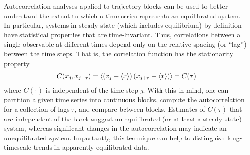 Autocorrelation analyses applied to trajectory blocks can be used to better understand the extent to which a time series represents an equilibrated system.  In particular, systems in steady-state (which includes equilibrium) by definition have statistical properties that are time-invariant.  Thus, correlations between a single observable at different times depend only on the relative spacing (or ``lag'') between the time steps.  That is, the correlation function has the stationarity property
%
\begin{equation}
 C(x_j,x_{j+\tau}) = \left< \left(x_j - \langle x \rangle \right) \left(x_{j+\tau} - \langle x \rangle \right) \right> = C(\tau)
\end{equation}
%
where $C(\tau)$ is independent of the time step $j$.  With this in mind, one can partition a given time series into continuous blocks, compute the autocorrelation for a collection of lags $\tau$, and compare between blocks.  Estimates of $C(\tau)$ that are independent of the block suggest an equilibrated (or at least a steady-state) system, whereas significant changes in the autocorrelation may indicate an unequilibrated system.  Importantly, this technique can help to distinguish long-timescale trends in apparently equilibrated data.



